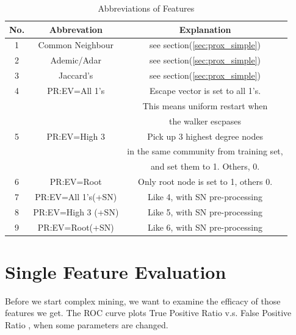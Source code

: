 \documentclass[11pt,a4paper]{article}
\begin{document}
\begin{table}[htb]
\centering
\caption{Abbreviations of Features}
\label{tbl:abbr}
\begin{tabular}{c|c|c}
\hline
No. & Abbrevation & Explanation \\
\hline
1 & Common Neighbour  & see section(\ref{sec:prox_simple}) \\
\hline
2 & Ademic/Adar  &  see section(\ref{sec:prox_simple})\\
\hline
3 & Jaccard’s & see section(\ref{sec:prox_simple}) \\
\hline
4 & PR:EV=All 1’s & Escape vector is set to all 1's.\\
 & & This means uniform restart when \\
 &  & the walker escpases \\
\hline
5 & PR:EV=High 3 & Pick up 3 highest degree nodes \\
 & & in the same community from training set, \\
 & & and set them to 1. Others, 0.  \\
\hline
6 & PR:EV=Root & Only root node is set to 1, others 0. \\
\hline
7 & PR:EV=All 1’s(+SN) & Like 4, with SN pre-processing\\
\hline
8 & PR:EV=High 3 (+SN) & Like 5, with SN pre-processing\\
\hline
9 & PR:EV=Root(+SN) & Like 6, with SN pre-processing\\
\hline
\end{tabular}
\end{table}

\section{Single Feature Evaluation}

Before we start complex mining, we want to examine the 
efficacy of those features we get. The ROC curve plots 
True Positive Ratio v.s. False Positive Ratio
\cite{wiki_roc}, when some parameters are changed. 
\end{document}
